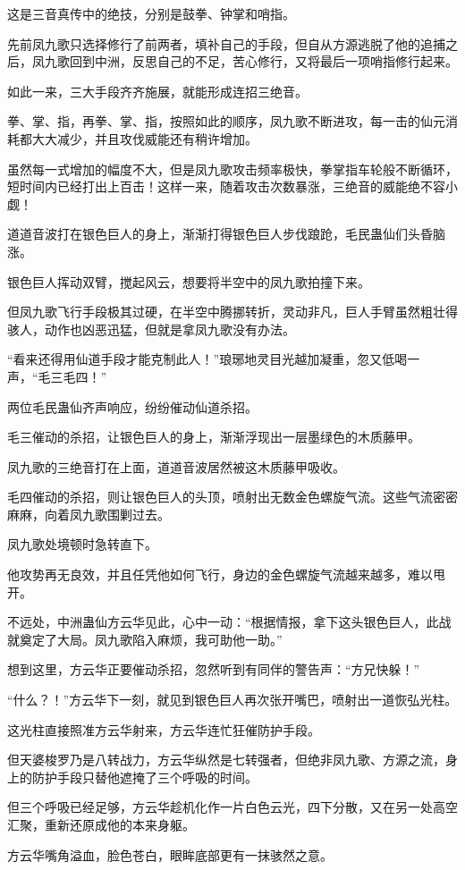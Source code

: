 \begin{this_body}
这是三音真传中的绝技，分别是鼓拳、钟掌和哨指。

先前凤九歌只选择修行了前两者，填补自己的手段，但自从方源逃脱了他的追捕之后，凤九歌回到中洲，反思自己的不足，苦心修行，又将最后一项哨指修行起来。

如此一来，三大手段齐齐施展，就能形成连招三绝音。

拳、掌、指，再拳、掌、指，按照如此的顺序，凤九歌不断进攻，每一击的仙元消耗都大大减少，并且攻伐威能还有稍许增加。

虽然每一式增加的幅度不大，但是凤九歌攻击频率极快，拳掌指车轮般不断循环，短时间内已经打出上百击！这样一来，随着攻击次数暴涨，三绝音的威能绝不容小觑！

道道音波打在银色巨人的身上，渐渐打得银色巨人步伐踉跄，毛民蛊仙们头昏脑涨。

银色巨人挥动双臂，搅起风云，想要将半空中的凤九歌拍撞下来。

但凤九歌飞行手段极其过硬，在半空中腾挪转折，灵动非凡，巨人手臂虽然粗壮得骇人，动作也凶恶迅猛，但就是拿凤九歌没有办法。

“看来还得用仙道手段才能克制此人！”琅琊地灵目光越加凝重，忽又低喝一声，“毛三毛四！”

两位毛民蛊仙齐声响应，纷纷催动仙道杀招。

毛三催动的杀招，让银色巨人的身上，渐渐浮现出一层墨绿色的木质藤甲。

凤九歌的三绝音打在上面，道道音波居然被这木质藤甲吸收。

毛四催动的杀招，则让银色巨人的头顶，喷射出无数金色螺旋气流。这些气流密密麻麻，向着凤九歌围剿过去。

凤九歌处境顿时急转直下。

他攻势再无良效，并且任凭他如何飞行，身边的金色螺旋气流越来越多，难以甩开。

不远处，中洲蛊仙方云华见此，心中一动：“根据情报，拿下这头银色巨人，此战就奠定了大局。凤九歌陷入麻烦，我可助他一助。”

想到这里，方云华正要催动杀招，忽然听到有同伴的警告声：“方兄快躲！”

“什么？！”方云华下一刻，就见到银色巨人再次张开嘴巴，喷射出一道恢弘光柱。

这光柱直接照准方云华射来，方云华连忙狂催防护手段。

但天婆梭罗乃是八转战力，方云华纵然是七转强者，但绝非凤九歌、方源之流，身上的防护手段只替他遮掩了三个呼吸的时间。

但三个呼吸已经足够，方云华趁机化作一片白色云光，四下分散，又在另一处高空汇聚，重新还原成他的本来身躯。

方云华嘴角溢血，脸色苍白，眼眸底部更有一抹骇然之意。


\end{this_body}
